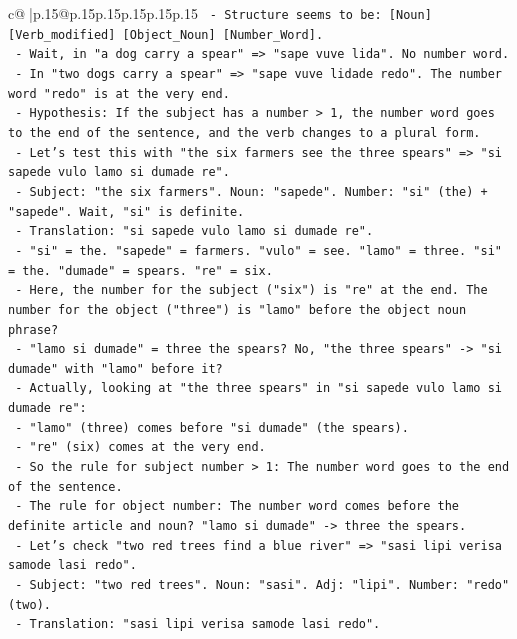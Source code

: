 \documentclass{article}
\begin{document}
{\begin{supertabular}{c@{$\;$}|p{.15\linewidth}@{}p{.15\linewidth}p{.15\linewidth}p{.15\linewidth}p{.15\linewidth}p{.15\linewidth}}
{{{\texttt{    {-} Structure seems to be: {[}Noun{]} {[}Verb\_modified{]} {[}Object\_Noun{]} {[}Number\_Word{]}.} \\
\texttt{    {-} Wait, in "a dog carry a spear" => "sape vuve lida". No number word.} \\
\texttt{    {-} In "two dogs carry a spear" => "sape vuve lidade redo". The number word "redo" is at the very end.} \\
\texttt{    {-} Hypothesis: If the subject has a number > 1, the number word goes to the end of the sentence, and the verb changes to a plural form.} \\
\texttt{    {-} Let's test this with "the six farmers see the three spears" => "si sapede vulo lamo si dumade re".} \\
\texttt{      {-} Subject: "the six farmers". Noun: "sapede". Number: "si" (the) + "sapede". Wait, "si" is definite.} \\
\texttt{      {-} Translation: "si sapede vulo lamo si dumade re".} \\
\texttt{      {-} "si" = the. "sapede" = farmers. "vulo" = see. "lamo" = three. "si" = the. "dumade" = spears. "re" = six.} \\
\texttt{      {-} Here, the number for the subject ("six") is "re" at the end. The number for the object ("three") is "lamo" before the object noun phrase?} \\
\texttt{      {-} "lamo si dumade" = three the spears? No, "the three spears" {-}> "si dumade" with "lamo" before it?} \\
\texttt{      {-} Actually, looking at "the three spears" in "si sapede vulo lamo si dumade re":} \\
\texttt{        {-} "lamo" (three) comes before "si dumade" (the spears).} \\
\texttt{        {-} "re" (six) comes at the very end.} \\
\texttt{      {-} So the rule for subject number > 1: The number word goes to the end of the sentence.} \\
\texttt{      {-} The rule for object number: The number word comes before the definite article and noun? "lamo si dumade" {-}> three the spears.} \\
\texttt{      {-} Let's check "two red trees find a blue river" => "sasi lipi verisa samode lasi redo".} \\
\texttt{        {-} Subject: "two red trees". Noun: "sasi". Adj: "lipi". Number: "redo" (two).} \\
\texttt{        {-} Translation: "sasi lipi verisa samode lasi redo".} \\
}}}
\end{supertabular}}
\end{document}
